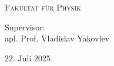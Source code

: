 \begin{titlepage}
    \vfill
    \vspace{0.7cm}
    \textsc{Fakultät für Physik}
    
    \vspace{0.6cm}
    \vspace{0.3cm}


    Supervisor: \\apl. Prof. Vladislav Yakovlev %

    \vfill
    \vspace{0.9cm}
    
    {\Large 22. Juli 2025}
    
\end{titlepage}